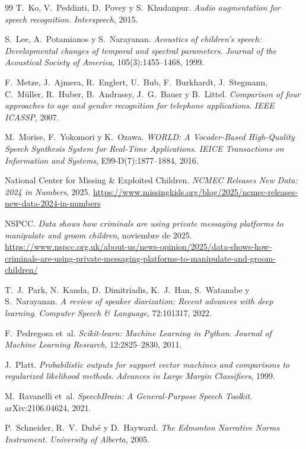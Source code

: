 \documentclass[11pt,a4paper]{article}
\begin{document}
\begin{thebibliography}{99}
 T.~Ko, V.~Peddinti, D.~Povey y S.~Khudanpur. \emph{Audio augmentation for speech recognition}. \emph{Interspeech}, 2015.

 S.~Lee, A.~Potamianos y S.~Narayanan. \emph{Acoustics of children's speech: Developmental changes of temporal and spectral parameters}. \emph{Journal of the Acoustical Society of America}, 105(3):1455--1468, 1999.

 F.~Metze, J.~Ajmera, R.~Englert, U.~Bub, F.~Burkhardt, J.~Stegmann, C.~Müller, R.~Huber, B.~Andrassy, J.~G.~Bauer y B.~Littel. \emph{Comparison of four approaches to age and gender recognition for telephone applications}. \emph{IEEE ICASSP}, 2007.

 M.~Morise, F.~Yokomori y K.~Ozawa. \emph{WORLD: A Vocoder-Based High-Quality Speech Synthesis System for Real-Time Applications}. \emph{IEICE Transactions on Information and Systems}, E99-D(7):1877--1884, 2016.

 National Center for Missing \& Exploited Children. \emph{NCMEC Releases New Data: 2024 in Numbers}, 2025. \url{https://www.missingkids.org/blog/2025/ncmec-releases-new-data-2024-in-numbers}

 NSPCC. \emph{Data shows how criminals are using private messaging platforms to manipulate and groom children}, noviembre de 2025. \url{https://www.nspcc.org.uk/about-us/news-opinion/2025/data-shows-how-criminals-are-using-private-messaging-platforms-to-manipulate-and-groom-children/}

 T.~J.~Park, N.~Kanda, D.~Dimitriadis, K.~J.~Han, S.~Watanabe y S.~Narayanan. \emph{A review of speaker diarization: Recent advances with deep learning}. \emph{Computer Speech \& Language}, 72:101317, 2022.

 F.~Pedregosa et~al. \emph{Scikit-learn: Machine Learning in Python}. \emph{Journal of Machine Learning Research}, 12:2825--2830, 2011.

 J.~Platt. \emph{Probabilistic outputs for support vector machines and comparisons to regularized likelihood methods}. \emph{Advances in Large Margin Classifiers}, 1999.

 M.~Ravanelli et~al. \emph{SpeechBrain: A General-Purpose Speech Toolkit}. arXiv:2106.04624, 2021.

 P.~Schneider, R.~V.~Dubé y D.~Hayward. \emph{The Edmonton Narrative Norms Instrument}. \emph{University of Alberta}, 2005.


\end{thebibliography}
\end{document}
